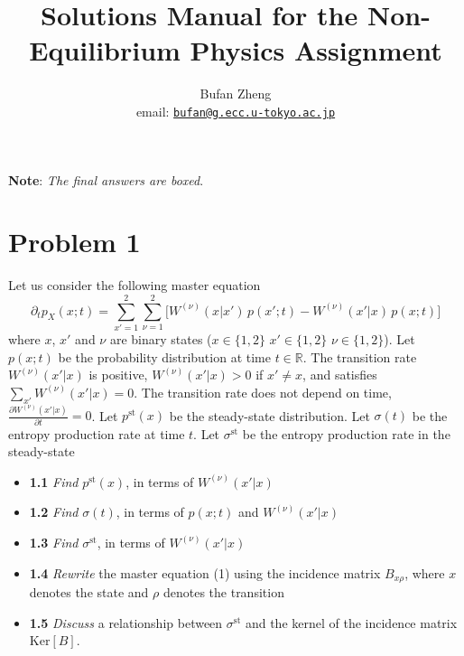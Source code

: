 \documentclass[11pt]{article}
\begin{document}
	\title{Solutions Manual for the Non-Equilibrium Physics Assignment}
	\author{Bufan Zheng\\email: \href{mailto:bufan@g.ecc.u-tokyo.ac.jp}{\texttt{bufan@g.ecc.u-tokyo.ac.jp}}}
	\date{}
	\maketitle
	
	\textbf{Note}: \emph{The final answers are boxed}.
	
	\section{Problem 1}
	Let us consider the following master equation
	\begin{equation}
		\partial_t p_X(x;t)
		=
		\sum_{x'=1}^{2}\sum_{\nu=1}^{2}
		\Big[
		W^{(\nu)}(x|x')\,p(x';t)
		-
		W^{(\nu)}(x'|x)\,p(x;t)
		\Big]
		\tag{1}
	\end{equation}
	where $x$, $x'$ and $\nu$ are binary states ($x \in \{1,2\}$  $x' \in \{1,2\}$   $\nu \in \{1,2\}$). Let $p(x;t)$ be the probability distribution at time $t \in \mathbb{R}$. The transition rate $W^{(\nu)}(x'|x)$ is positive, $W^{(\nu)}(x'|x) > 0$ if $x' \ne x$, and satisfies $\sum_{x'} W^{(\nu)}(x'|x) = 0$. The transition rate does not depend on time,$\frac{\partial W^{(\nu)}(x'|x)}{\partial t} = 0$. Let $p^{\mathrm{st}}(x)$ be the steady-state distribution. Let $\sigma(t)$ be the entropy production rate at time $t$. Let $\sigma^{\mathrm{st}}$ be the entropy production rate in the steady-state
	
	\begin{itemize}
		\item \textbf{1.1}
		\emph{Find} $p^{\mathrm{st}}(x)$, in terms of $W^{(\nu)}(x'|x)$
		
		\item\textbf{1.2}
		\emph{Find} $\sigma(t)$, in terms of $p(x;t)$ and $W^{(\nu)}(x'|x)$
		
		\item\textbf{1.3}
		\emph{Find} $\sigma^{\mathrm{st}}$, in terms of $W^{(\nu)}(x'|x)$
		
		\item\textbf{1.4}
		\emph{Rewrite} the master equation (1) using the incidence matrix $B_{x\rho}$, where $x$ denotes the state and $\rho$ denotes the transition
		
		\item\textbf{1.5}
		\emph{Discuss} a relationship between $\sigma^{\mathrm{st}}$ and the kernel of the incidence matrix $\mathrm{Ker}[B]$.
	\end{itemize}
\end{document}
